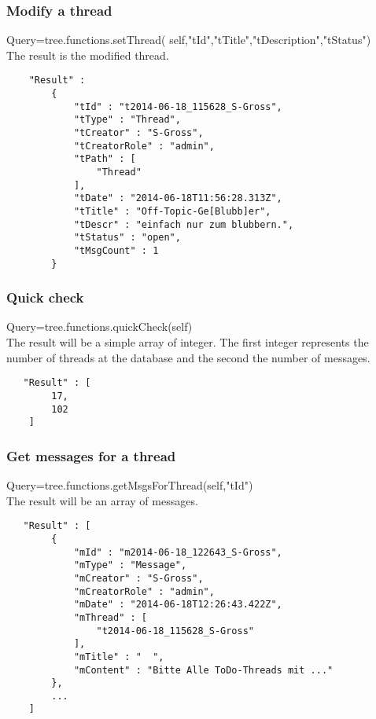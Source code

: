 \documentclass[12pt,a4paper,oneside]{report}
\begin{document}
\subsubsection{Modify a thread}
Query=tree.functions.setThread( self,"tId","tTitle","tDescription","tStatus")
\\The result is the modified thread.
\begin{lstlisting}
    "Result" : 
    	{ 
            "tId" : "t2014-06-18_115628_S-Gross",
            "tType" : "Thread",
            "tCreator" : "S-Gross",
            "tCreatorRole" : "admin",
            "tPath" : [  
                "Thread"
            ],
            "tDate" : "2014-06-18T11:56:28.313Z",
            "tTitle" : "Off-Topic-Ge[Blubb]er",
            "tDescr" : "einfach nur zum blubbern.",
            "tStatus" : "open",
            "tMsgCount" : 1
        }
\end{lstlisting}

\subsubsection{Quick check}
Query=tree.functions.quickCheck(self)\\
The result will be a simple array of integer. The first integer represents the number of threads at the database and the second the number of messages.

\begin{lstlisting}
   "Result" : [  
        17,
        102
    ]
\end{lstlisting}

\subsubsection{Get messages for a thread}
Query=tree.functions.getMsgsForThread(self,"tId")\\
The result will be an array of messages.
\begin{lstlisting}
   "Result" : [  
        { 
            "mId" : "m2014-06-18_122643_S-Gross",
            "mType" : "Message",
            "mCreator" : "S-Gross",
            "mCreatorRole" : "admin",
            "mDate" : "2014-06-18T12:26:43.422Z",
            "mThread" : [  
                "t2014-06-18_115628_S-Gross"
            ],
            "mTitle" : "  ",
            "mContent" : "Bitte Alle ToDo-Threads mit ..."
        },
        ...
    ]
\end{lstlisting}
\end{document}
